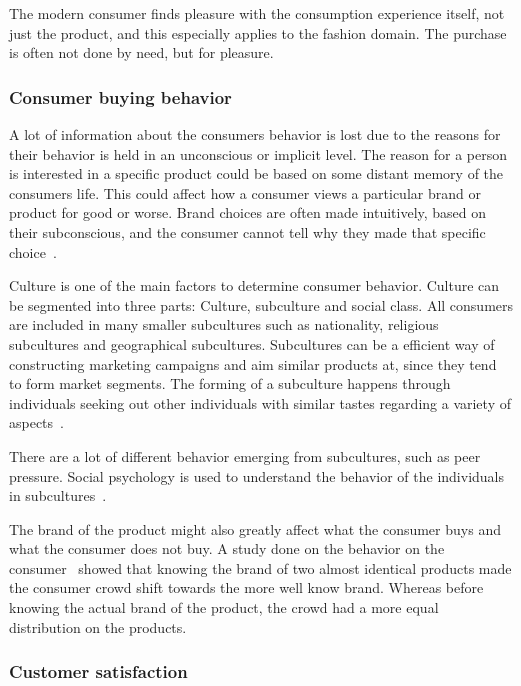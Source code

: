The modern consumer finds pleasure with the consumption experience itself, not
just the product, and this especially applies to the fashion domain.  The
purchase is often not done by need, but for pleasure.

\subsubsection{Consumer buying behavior}

A lot of information about the consumers behavior is lost due to the reasons
for their behavior is held in an unconscious or implicit level.  The reason for
a person is interested in a specific product could be based on some distant
memory of the consumers life.  This could affect how a consumer views a
particular brand or product for good or worse.  Brand choices are often made
intuitively, based on their subconscious, and the consumer cannot tell why
they made that specific choice~\cite{vignali2009fashion}.

Culture is one of the main factors to determine consumer behavior.  Culture can
be segmented into three parts: Culture, subculture and social class.  All
consumers are included in many smaller subcultures such as nationality,
religious subcultures and geographical subcultures.  Subcultures can be a
efficient way of constructing marketing campaigns and aim similar products at,
since they tend to form market segments.  The forming of a subculture happens
through individuals seeking out other individuals with similar tastes regarding
a variety of aspects~\cite{vignali2009fashion}.

There are a lot of different behavior emerging from subcultures, such as peer
pressure.  Social psychology is used to understand the behavior of the
individuals in subcultures~\cite{vignali2009fashion}.

The brand of the product might also greatly affect what the consumer buys and
what the consumer does not buy.  A study done on the behavior on the
consumer~\cite{deLace2010} showed that knowing the brand of two almost
identical products made the consumer crowd shift towards the more well know
brand.  Whereas before knowing the actual brand of the product, the crowd had a
more equal distribution on the products.

\subsubsection{Customer satisfaction}

